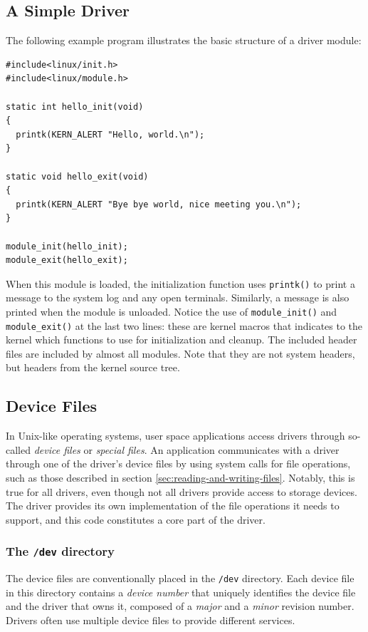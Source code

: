 \subsection{A Simple Driver}\label{a-simple-driver}
The following example program illustrates the basic structure of a driver module:
\lstset{style=lststyle-c}
\begin{lstlisting}
#include<linux/init.h>
#include<linux/module.h>

static int hello_init(void)
{
  printk(KERN_ALERT "Hello, world.\n");
}

static void hello_exit(void)
{
  printk(KERN_ALERT "Bye bye world, nice meeting you.\n");
}

module_init(hello_init);
module_exit(hello_exit);
\end{lstlisting}
When this module is loaded, the initialization function uses \texttt{printk()} to print a message to the system log and any open terminals. Similarly, a message is also printed when the module is unloaded. Notice the use of \texttt{module\_init()} and \texttt{module\_exit()} at the last two lines: these are kernel macros that indicates to the kernel which functions to use for initialization and cleanup. The included header files are included by almost all modules. Note that they are not system headers, but headers from the kernel source tree.

\subsection{Device Files}\label{device-files}
In Unix-like operating systems, user space applications access drivers through so-called \emph{device files} or \emph{special files}. An application communicates with a driver through one of the driver's device files by using system calls for file operations, such as those described in section \ref{sec:reading-and-writing-files}. Notably, this is true for all drivers, even though not all drivers provide access to storage devices. The driver provides its own implementation of the file operations it needs to support, and this code constitutes a core part of the driver.

\subsubsection{The \texttt{/dev} directory}
The device files are conventionally placed in the \texttt{/dev} directory. Each device file in this directory contains a \emph{device number} that uniquely identifies the device file and the driver that owns it, composed of a \emph{major} and a \emph{minor} revision number. Drivers often use multiple device files to provide different services.

